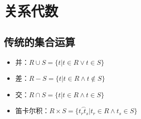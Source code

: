 \section{关系代数}

\subsection{传统的集合运算}
\begin{itemize}
    \item 并：$R\cup S = \{t|t\in R \vee t\in S\}$
    \item 差：$R - S = \{t|t\in R \wedge  t\notin S\}$
    \item 交：$R\cap S = \{t|t\in R \wedge  t\in S\}$
    \item 笛卡尔积：$R\times S = \{\overset{\frown}{t_rt_s} |t_r\in R \wedge  t_s \in S\}$
\end{itemize}

